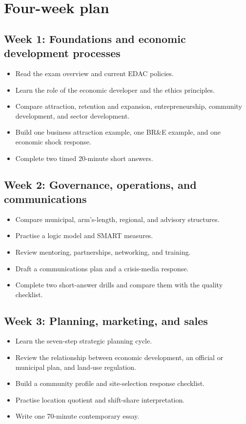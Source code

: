 \documentclass[11pt,letterpaper,oneside,openany]{book}
\begin{document}
\section[Four-week plan]{Four-week plan}
\subsection[Week 1: Foundations and economic development processes]{Week 1: Foundations and economic development processes}
\begin{itemize}
\item Read the exam overview and current EDAC policies.
\item Learn the role of the economic developer and the ethics principles.
\item Compare attraction, retention and expansion, entrepreneurship, community development, and sector development.
\item Build one business attraction example, one BR\&E example, and one economic shock response.
\item Complete two timed 20-minute short answers.
\end{itemize}


\subsection[Week 2: Governance, operations, and communications]{Week 2: Governance, operations, and communications}
\begin{itemize}
\item Compare municipal, arm's-length, regional, and advisory structures.
\item Practise a logic model and SMART measures.
\item Review mentoring, partnerships, networking, and training.
\item Draft a communications plan and a crisis-media response.
\item Complete two short-answer drills and compare them with the quality checklist.
\end{itemize}


\subsection[Week 3: Planning, marketing, and sales]{Week 3: Planning, marketing, and sales}
\begin{itemize}
\item Learn the seven-step strategic planning cycle.
\item Review the relationship between economic development, an official or municipal plan, and land-use regulation.
\item Build a community profile and site-selection response checklist.
\item Practise location quotient and shift-share interpretation.
\item Write one 70-minute contemporary essay.
\end{itemize}
\end{document}
